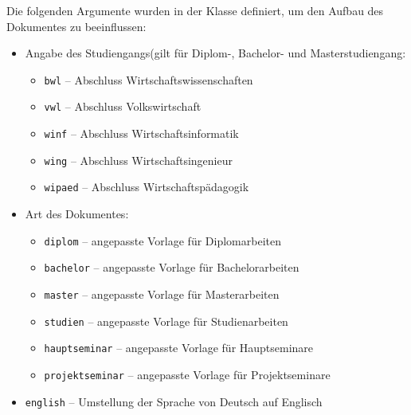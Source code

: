 Die folgenden Argumente wurden in der Klasse definiert, um den Aufbau des Dokumentes zu beeinflussen:
\begin{itemize}
  \item{Angabe des Studiengangs(gilt für Diplom-, Bachelor- und Masterstudiengang:}

    \begin{itemize}

        \item{\verb"bwl"} -- Abschluss Wirtschaftswissenschaften

        \item{\verb"vwl"} -- Abschluss Volkswirtschaft

        \item{\verb"winf"} -- Abschluss Wirtschaftsinformatik

        \item{\verb"wing"} -- Abschluss Wirtschaftsingenieur

        \item{\verb"wipaed"} -- Abschluss Wirtschaftspädagogik
        

    \end{itemize}

  \item {Art des Dokumentes:}

    \begin{itemize}

        \item{\verb"diplom"} -- angepasste Vorlage für Diplomarbeiten

	\item{\verb"bachelor"} -- angepasste Vorlage für Bachelorarbeiten

	\item{\verb"master"} -- angepasste Vorlage für Masterarbeiten

        \item{\verb"studien"} -- angepasste Vorlage für Studienarbeiten

        \item{\verb"hauptseminar"} -- angepasste Vorlage für Hauptseminare

        \item{\verb"projektseminar"} -- angepasste Vorlage für Projektseminare

            \end{itemize}

  \item{\verb"english"} -- Umstellung der Sprache von Deutsch auf Englisch


\end{itemize}
